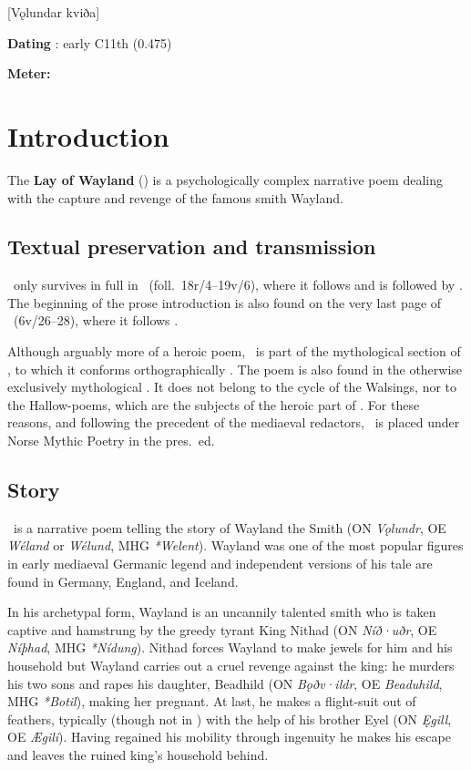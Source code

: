 [Vǫlundar kviða]

\begin{flushright}%
\textbf{Dating} \parencite{Sapp2022}: early C11th (0.475)

\textbf{Meter:} \Fornyrdislag%
\end{flushright}%

\section{Introduction}

The \textbf{Lay of Wayland} () is a psychologically complex narrative poem dealing with the capture and revenge of the famous smith Wayland.

\subsection{Textual preservation and transmission}

\Volundarkvida\ only survives in full in \Regius\ (foll.~18r/4--19v/6), where it follows  and is followed by .  The beginning of the prose introduction is also found on the very last page of \AM\ (6v/26--28), where it follows .

Although arguably more of a heroic poem, \Volundarkvida\ is part of the mythological section of \Regius, to which it conforms orthographically \parencite[160--166]{Lindblad1980}.  The poem is also found in the otherwise exclusively mythological \AM.  It does not belong to the cycle of the Walsings, nor to the Hallow-poems, which are the subjects of the heroic part of \Regius.  For these reasons, and following the precedent of the mediaeval redactors, \Volundarkvida\ is placed under Norse Mythic Poetry in the pres.~ed.

\subsection{Story}

\Volundarkvida\ is a narrative poem telling the story of Wayland the Smith (ON \emph{Vǫlundr}, OE \emph{Wéland} or \emph{Wélund}, MHG \emph{*Welent}).  Wayland was one of the most popular figures in early mediaeval Germanic legend and independent versions of his tale are found in Germany, England, and Iceland.

In his archetypal form, Wayland is an uncannily talented smith who is taken captive and hamstrung by the greedy tyrant King Nithad (ON \emph{Níð·uðr}, OE \emph{Níþhad}, MHG \emph{*Nídung}).  Nithad forces Wayland to make jewels for him and his household but Wayland carries out a cruel revenge against the king: he murders his two sons and rapes his daughter, Beadhild (ON \emph{Bǫðv·ildr}, OE \emph{Beaduhild}, MHG \emph{*Botil}), making her pregnant.  At last, he makes a flight-suit out of feathers, typically (though not in \Volundarkvida) with the help of his brother Eyel (ON \emph{Ęgill}, OE \emph{Ægili}).  Having regained his mobility through ingenuity he makes his escape and leaves the ruined king’s household behind.

